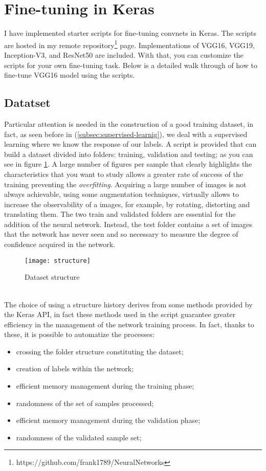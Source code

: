 \section{Fine-tuning in Keras}
\label{sec:finetuningkeras}
%
I have implemented starter scripts for fine-tuning convnets in Keras. 
The scripts are hosted in my remote 
repository\footnote{https://github.com/frank1789/NeuralNetworks} page.
Implementations of VGG16, VGG19, Inception-V3, and ResNet50 are included. 
With that, you can customize the scripts for your own fine-tuning task.
Below is a detailed walk through of how to fine-tune VGG16 model using the 
scripts.
%
\subsection{Datatset}
\label{subsec:dataset}
Particular attention is needed in the construction of a good training dataset, 
in fact, as seen before in (\ref{subsec:supervised-learnig}), we deal with a 
supervised learning where we know the response of our labels.
A script is provided that can build a dataset divided into folders: training, 
validation and testing; as you can see in figure \ref{fig:datasetstructure}.
A large number of figures per sample that clearly highlights the characteristics 
that you want to study allows a greater rate of success of the training 
preventing the \emph{overfitting}.
Acquiring a large number of images is not always achievable, using some 
augmentation techniques, virtually allows to increase the observability of a 
images, for example, by rotating, distorting and translating them.
The two train and validated folders are essential for the addition of the 
neural network.
Instead, the test folder contains a set of images that the network has never 
seen and so necessary to measure the degree of confidence acquired in the network.\linebreak
%
\begin{figure}[htb]
\centering
\texttt{[image: structure]}
\caption{Dataset structure}
\label{fig:datasetstructure}
\end{figure}
%
\\\noindent The choice of using a structure history derives from some methods provided by 
the Keras API, in fact these methods used in the script guarantee greater 
efficiency in the management of the network training process.
In fact, thanks to these, it is possible to automatize the processes:
\begin{itemize}
\item crossing the folder structure constituting the dataset;
\item creation of labels within the network;
\item efficient memory management during the training phase;
\item randomness of the set of samples processed;
\item efficient memory management during the validation phase;
\item randomness of the validated sample set;
\end{itemize}
%
